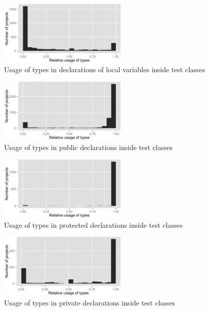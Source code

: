 \begin{figure}[h]
\centering 
\includegraphics[width=0.55\textwidth]{../aosd_2014/analysis/result/test/test/histograms/6_Local_Variable.png} 
\caption{Usage of types in declarations of local variables inside test classes}
\end{figure}

\begin{figure}[h]
\centering 
\includegraphics[width=0.55\textwidth]{../aosd_2014/analysis/result/test/test/histograms/13_Public.png} 
\caption{Usage of types in public declarations inside test classes}
\end{figure}

\begin{figure}[h]
\centering 
\includegraphics[width=0.55\textwidth]{../aosd_2014/analysis/result/test/test/histograms/12_Protected.png} 
\caption{Usage of types in protected declarations inside test classes}
\end{figure}

\begin{figure}[h]
\centering 
\includegraphics[width=0.55\textwidth]{../aosd_2014/analysis/result/test/test/histograms/11_Private.png} 
\caption{Usage of types in private declarations inside test classes}
\end{figure}

